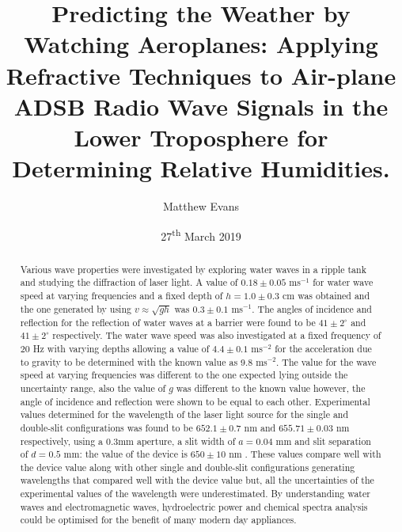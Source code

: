 \documentclass{article}
\title{\textbf{Predicting the Weather by Watching Aeroplanes: 
\newline
Applying Refractive Techniques to Air-plane ADSB Radio Wave Signals in the Lower Troposphere for Determining Relative Humidities.}} %
\author{Matthew Evans}%
\date{27\textsuperscript{th} March 2019} %
\begin{document}
\maketitle %
\thispagestyle{empty}
\newpage

\vspace*{\fill}
\begin{abstract}

\noindent
Various wave properties were investigated by exploring water waves in a ripple tank and studying the diffraction of laser light. A value of $ 0.18 \pm 0.05$ ms$^{-1}$ for water wave speed at varying frequencies and a fixed depth of $h = 1.0 \pm 0.3$ cm was obtained and the one generated by using $v \approx \sqrt{gh}$ \cite{Book02} was $ 0.3 \pm 0.1$ ms$^{-1}$. The angles of incidence and reflection for the reflection of water waves at a barrier were found to be $41 \pm 2^{\circ}$ and $41 \pm 2^{\circ}$ respectively. The water wave speed was also investigated at a fixed frequency of $20$ Hz with varying depths allowing a value of $4.4 \pm 0.1$ ms$^{-2}$ for the acceleration due to gravity to be determined with the known value as 9.8 ms$^{-2}$. The value for the wave speed at varying frequencies was different to the one expected lying outside the uncertainty range, also the value of $g$ was different to the known value however, the angle of incidence and reflection were shown to be equal to each other. Experimental values determined for the wavelength of the laser light source for the single and double-slit configurations was found to be $652.1 \pm 0.7$ nm and $655.71 \pm 0.03$ nm respectively, using a 0.3mm aperture, a slit width of $a = 0.04$ mm and slit separation of $d = 0.5$ mm: the value of the device is $650 \pm 10$ nm \cite{Web02}. These values compare well with the device value along with other single and double-slit configurations generating wavelengths that compared well with the device value but, all the uncertainties of the experimental values of the wavelength were underestimated. By understanding water waves and electromagnetic waves, hydroelectric power and chemical spectra analysis could be optimised for the benefit of many modern day appliances.
\thispagestyle{empty}
\end{abstract}
\vspace*{\fill}

\vspace{5mm} %

\newpage
\end{document}
